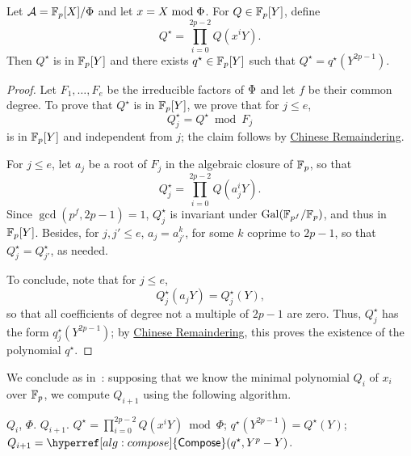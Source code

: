 \begin{lemma}
  \label{lemma:poly-cyclic}
  Let $\mathcal{A}=\mathbb{F}_p[X]/\Phi$ and let $x = X \bmod \Phi$. For
  $Q\in\mathbb{F}_p[Y]$, define 
  \begin{equation}
    Q^\star = \prod_{i=0}^{2p-2}Q(x^iY)
    \text{.}    
  \end{equation}
  Then $Q^\star$ is in $\mathbb{F}_p[Y]$ and there exists $q^\star\in\mathbb{F}_p[Y]$
  such that $Q^\star = q^\star(Y^{2p-1})$.
\end{lemma}
\begin{proof}
  Let $F_1,\dots,F_e$ be the irreducible factors of $\Phi$ and let
  $f$ be their common degree. To prove that $Q^\star$ is in $\mathbb{F}_p[Y]$,
  we prove that for $j \le e$, 
  \begin{equation}
    Q^\star_j = Q^\star \bmod F_j    
  \end{equation}
  is in $\mathbb{F}_p[Y]$ and independent from $j$; the claim follows by
  \hyperref[th:chinese-remainder]{Chinese Remaindering}.

  For $j \le e$, let $a_j$ be a root of $F_j$ in the algebraic closure
  of $\mathbb{F}_p$, so that
  \begin{equation}
    Q^\star_j = \prod_{i=0}^{2p-2}Q(a_j^iY)
    \text{.}
  \end{equation}
  Since $\gcd(p^f,2p-1)=1$, $Q^\star_j$ is invariant under ${\rm
    Gal}(\mathbb{F}_{p^f}/\mathbb{F}_p)$, and thus in $\mathbb{F}_p[Y]$. Besides, for $j,j'\le
  e$, $a_j = a_{j'}^k$, for some $k$ coprime to $2p-1$, so that
  $Q^\star_j= Q^\star_{j'}$, as needed.

  To conclude, note that for $j \le e$,
  \begin{equation}
    Q^\star_j(a_jY)=Q^\star_j(Y)
    \text{,}    
  \end{equation}
  so that all coefficients of degree not a multiple of $2p-1$ are
  zero.  Thus, $Q^\star_j$ has the form $q^\star_j(Y^{2p-1})$; by
  \hyperref[th:chinese-remainder]{Chinese Remaindering}, this proves
  the existence of the polynomial $q^\star$.
\end{proof}


We conclude as in~\cite{cantor89}: supposing that we know the minimal
polynomial $Q_i$ of $x_i$ over $\mathbb{F}_p$, we compute $Q_{i+1}$ using the
following algorithm.

\begin{algorithm}
  \caption{\label{alg:minimalpolynomial}}
  \begin{algorithmic}[1]
    \REQUIRE $Q_i$, $\Phi$.
    \ENSURE $Q_{i+1}$.
    \STATE \label{alg:minpol-Qstar}$Q^\star = \prod_{i=0}^{2p-2}Q(x^iY) \bmod \Phi$;
    \STATE \label{alg:minpol-qstar}$q^\star(Y^{2p-1}) = Q^\star(Y)$;
    \STATE \label{alg:minpol-Q}$Q_{i+1} = \hyperref[alg:compose]{\alg{Compose}}(q^\star,Y^p-Y)$.
  \end{algorithmic}
\end{algorithm}


